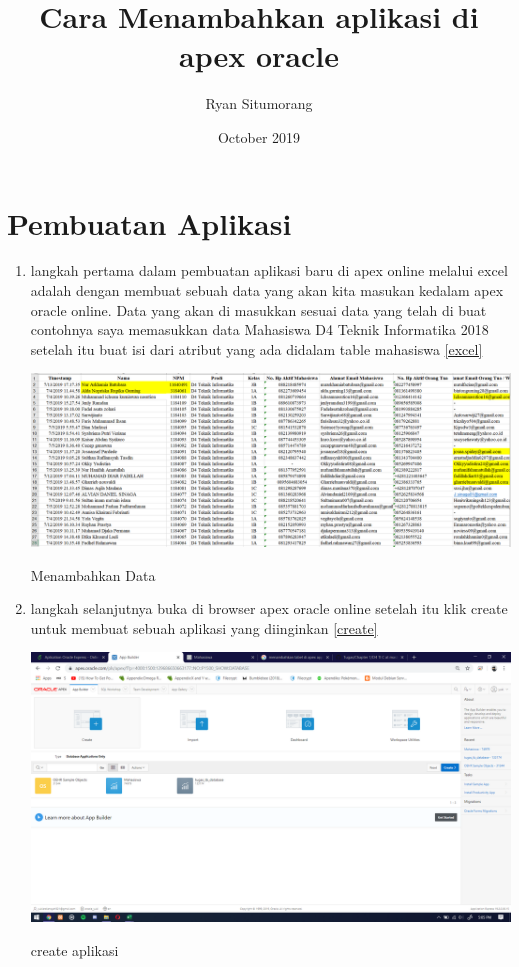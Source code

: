 \documentclass{article}
\title{Cara Menambahkan aplikasi di apex oracle}
\author{Ryan Situmorang }
\date{October 2019}
\begin{document}
\maketitle

\section{Pembuatan Aplikasi}

\begin{enumerate}
    \item langkah pertama dalam pembuatan aplikasi baru di apex online melalui excel adalah dengan membuat sebuah data yang akan kita masukan kedalam apex oracle online. Data yang akan di masukkan sesuai data yang telah di buat contohnya saya memasukkan data Mahasiswa D4 Teknik Informatika 2018 setelah itu buat isi dari atribut yang ada didalam table mahasiswa
    \ref{excel}
    \begin{center}
         \centering
            \includegraphics[scale=0.27]{figures/DB0.png}
        \caption{Menambahkan Data}
        \label{excel}
    \end{center}
       
     \item langkah selanjutnya buka di browser apex oracle online setelah itu klik create untuk membuat sebuah aplikasi yang diinginkan
      \ref{create}
    \begin{center}
         \centering
            \includegraphics[scale=0.27]{figures/DB1.png}
        \caption{create aplikasi}
        \label{create}
    \end{center}
    

\end{enumerate}
\end{document}
